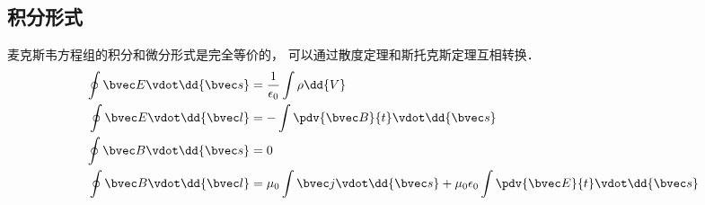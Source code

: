 \subsection{积分形式}
麦克斯韦方程组的积分和微分形式是完全等价的， 可以通过散度定理和斯托克斯定理互相转换．
\begin{align}
\oint \bvec E \vdot \dd{\bvec s} &= \frac{1}{\epsilon_0}\int \rho \dd{V}\\
\oint \bvec E \vdot \dd{\bvec l} &= -\int \pdv{\bvec B}{t} \vdot \dd{\bvec s}\\
\oint \bvec B \vdot \dd{\bvec s} &= 0\\
\oint \bvec B \vdot \dd{\bvec l} &= \mu_0 \int \bvec j \vdot \dd{\bvec s} + \mu_0 \epsilon_0 \int \pdv{\bvec E}{t} \vdot \dd{\bvec s}
\end{align}
